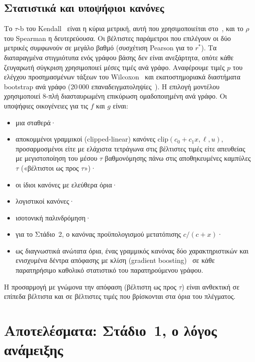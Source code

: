 \documentclass[11pt,a4paper]{article}
\theoremstyle{definition}
\theoremstyle{remark}
\newcommand{\clip}{\mathrm{clip}}
\begin{document}
\subsection{Στατιστικά και υποψήφιοι κανόνες}
Το $\tau$-b του Kendall~\cite{kendall38,kendall45} είναι η κύρια μετρική, αυτή που χρησιμοποιείται
στο~\cite{ng13}, και το $\rho$ του Spearman η δευτερεύουσα. Οι βέλτιστες παράμετροι που επιλέγουν οι
δύο μετρικές συμφωνούν σε μεγάλο βαθμό (συσχέτιση Pearson \SOneSpearmanKendall{} για το $r^*$). Τα
διαταραγμένα στιγμιότυπα ενός γράφου βάσης δεν είναι ανεξάρτητα, οπότε κάθε ζευγαρωτή σύγκριση
χρησιμοποιεί μέσες τιμές ανά γράφο. Αναφέρουμε τιμές $p$ του ελέγχου προσημασμένων τάξεων του
Wilcoxon~\cite{wilcoxon45} και εκατοστημοριακά διαστήματα bootstrap ανά γράφο (20\,000
επαναδειγματοληψίες~\cite{efron93}). Η επιλογή μοντέλου χρησιμοποιεί 8-πλή διασταυρωμένη επικύρωση
ομαδοποιημένη ανά γράφο. Οι υποψήφιες οικογένειες για τις $f$ και $g$ είναι:
\begin{itemize}[leftmargin=1.4em,itemsep=0pt]
\item μια σταθερά·
\item αποκομμένοι γραμμικοί (clipped-linear) κανόνες $\clip(c_0+c_1x,\ell,u)$, προσαρμοσμένοι είτε με ελάχιστα τετράγωνα στις
βέλτιστες τιμές είτε απευθείας με μεγιστοποίηση του μέσου $\tau$ βαθμονόμησης πάνω στις αποθηκευμένες
καμπύλες $\tau$ («βέλτιστοι ως προς $\tau$»)·
\item οι ίδιοι κανόνες με ελεύθερα όρια·
\item λογιστικοί κανόνες·
\item ισοτονική παλινδρόμηση·
\item για το Στάδιο~2, ο κανόνας προϋπολογισμού μετατόπισης $c/(c+x)$·
\item ως διαγνωστικά ανώτατα όρια, ένας γραμμικός κανόνας δύο χαρακτηριστικών και ενισχυμένα δέντρα
απόφασης με κλίση (gradient boosting)~\cite{friedman01} σε κάθε παρατηρήσιμο καθολικό στατιστικό του
παρατηρούμενου γράφου.
\end{itemize}
Η προσαρμογή με γνώμονα την απόφαση (βέλτιστη ως προς $\tau$) είναι ανθεκτική σε επίπεδα βέλτιστα και
σε βέλτιστες τιμές που βρίσκονται στα όρια του πλέγματος.

\section{Αποτελέσματα: Στάδιο~1, ο λόγος ανάμειξης}
\label{sec:res1}
\end{document}
